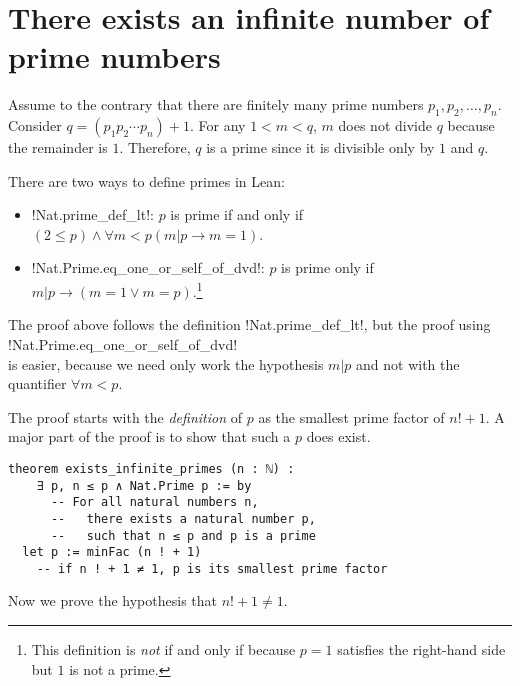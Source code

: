 
\section{There exists an infinite number of prime numbers}

Assume to the contrary that there are finitely many prime numbers $p_1,p_2,\ldots,p_n$. Consider $q=(p_1p_2\cdots p_n)+1$. For any $1<m<q$, $m$ does not divide $q$ because the remainder is $1$. Therefore, $q$ is a prime since it is divisible only by $1$ and $q$.

There are two ways to define primes in Lean:
\begin{itemize}
\item !Nat.prime_def_lt!: $p$ is prime if and only if $(2\leq p) \wedge \forall m < p (m|p \rightarrow m=1)$.

\item !Nat.Prime.eq_one_or_self_of_dvd!: $p$ is prime only if $m|p \rightarrow (m=1 \vee m=p)$.\footnote{This definition is \emph{not} if and only if because $p=1$ satisfies the right-hand side but $1$ is not a prime.}

\end{itemize}
The proof above follows the definition !Nat.prime_def_lt!, but the proof using\\
\indnt{}!Nat.Prime.eq_one_or_self_of_dvd!\\
is easier, because we need only work the hypothesis $m|p$ and not with the quantifier $\forall m<p$.

The proof starts with the \emph{definition} of $p$ as the smallest prime factor of \UndefineShortVerb{\!}$n!+1$.\DefineShortVerb{\!}  A major part of the proof is to show that such a $p$ does exist.

\begin{Verbatim}
theorem exists_infinite_primes (n : ℕ) :
    ∃ p, n ≤ p ∧ Nat.Prime p := by
      -- For all natural numbers n,
      --   there exists a natural number p,
      --   such that n ≤ p and p is a prime
  let p := minFac (n ! + 1)
    -- if n ! + 1 ≠ 1, p is its smallest prime factor
\end{Verbatim}


Now we prove the hypothesis that \UndefineShortVerb{\!}$n!+1 \neq 1$.\DefineShortVerb{\!}

